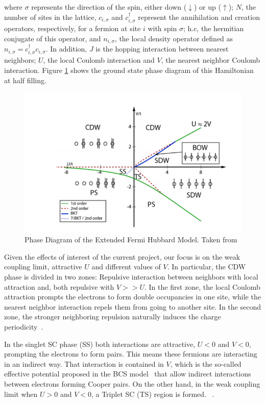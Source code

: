 \documentclass{article}
\begin{document}
where $\sigma$ represents the direction of the spin, either down ($\downarrow$) or up ($\uparrow$); $N$, the number of sites in the lattice, $c_{i,{\sigma}}$ and $c^{\dagger}_{i,{\sigma}}$ represent the annihilation and creation operators, respectively, for a fermion at site $i$ with spin $\sigma$; h.c, the hermitian conjugate of this operator, and $n_{i,\sigma}$, the local density operator defined as $n_{i,\sigma}=c^{\dagger}_{i,{\sigma}}c_{i,{\sigma}}$. In addition, $J$ is the hopping interaction between nearest neighbors; $U$, the local Coulomb interaction and $V$, the nearest neighbor Coulomb interaction. Figure \ref{phaseDiag} shows the ground state phase diagram of this Hamiltonian at half filling.

\begin{figure}
    \centering
    \includegraphics[scale=0.7]{phaseDiagramaHalfFilling.PNG}
    \caption{Phase Diagram of the Extended Fermi Hubbard Model. Taken from \cite{Diagram}}
    \label{phaseDiag}
\end{figure}

Given the effects of interest of the current project, our focus is on the weak coupling limit, attractive $U$ and different values of $V$. In particular,  the CDW phase is divided in two zones: Repulsive interaction between neighbors with local attraction and, both repulsive with $V>>U$. In the first zone, the local Coulomb attraction prompts the electrons to form double occupancies in one site, while the nearest neighbor interaction repels them from going to another site. In the second zone, the stronger neighboring repulsion naturally induces the charge periodicity~\cite{Diagram}.

In the singlet SC phase (SS) both interactions are attractive, $U<0$ and $V<0$, prompting the electrons to form pairs. This means these fermions are interacting in an indirect way. That interaction is contained in $V$, which is the so-called effective potential proposed in the BCS model~\cite{PhysRev.108.1175,Clase} that allow indirect interactions between electrons forming Cooper pairs. On the other hand, in the weak coupling limit when $U>0$ and $V<0$, a Triplet SC (TS) region is formed. ~\cite{Diagram}. 
\end{document}

